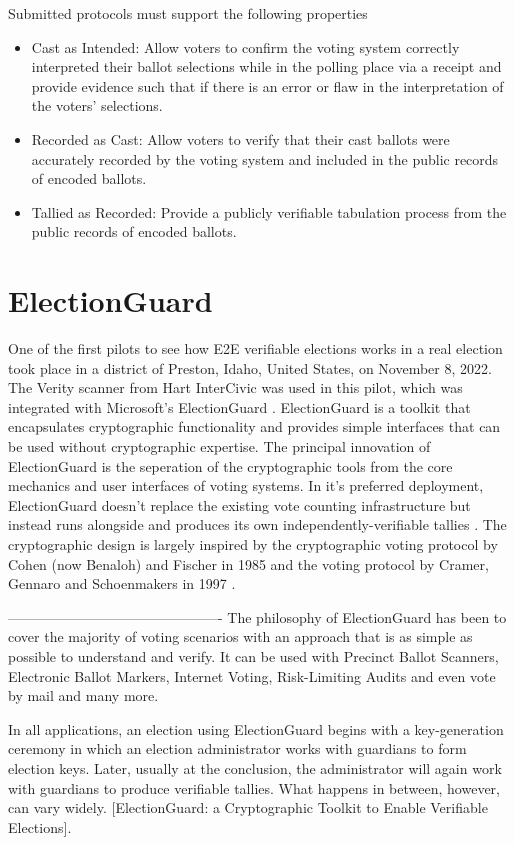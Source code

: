 Submitted protocols must support the following properties
\begin{itemize}
      \item Cast as Intended: Allow voters to confirm the voting system correctly interpreted their ballot selections while in the polling place via a receipt and provide evidence such that if there is an error or flaw in the interpretation of the voters’ selections.
      \item Recorded as Cast: Allow voters to verify that their cast ballots were accurately recorded by the voting system and included in the public records of encoded ballots.
      \item Tallied as Recorded: Provide a publicly verifiable tabulation process from the public records of encoded ballots.
\end{itemize}

\section{ElectionGuard}

One of the first pilots to see how E2E verifiable elections works in a real election took place in a district of Preston, Idaho, United States, on November 8, 2022. The Verity scanner from Hart InterCivic was used in this pilot, which was integrated with Microsoft's ElectionGuard \cite{EAC}. ElectionGuard is a toolkit that encapsulates cryptographic functionality and provides simple interfaces that can be used without cryptographic expertise. The principal innovation of ElectionGuard is the seperation of the cryptographic tools from the core mechanics and user interfaces of voting systems. In it's preferred deployment, ElectionGuard doesn't replace the existing vote counting infrastructure but instead runs alongside and produces its own independently-verifiable tallies \cite[1-2]{eg-paper}. The cryptographic design is largely inspired by the cryptographic voting protocol by Cohen (now Benaloh) and Fischer in 1985 and the voting protocol by Cramer, Gennaro and Schoenmakers in 1997 \cite[5]{eg-paper}. 

----------------------------------------------
The philosophy of ElectionGuard has been to cover the majority of voting scenarios with an approach that is as simple as possible to understand and verify. It can be used with Precinct Ballot Scanners, Electronic Ballot Markers, Internet Voting, Risk-Limiting Audits and even vote by mail and many more.

In all applications, an election using ElectionGuard begins with a key-generation ceremony in
which an election administrator works with guardians to form election keys. Later, usually at the
conclusion, the administrator will again work with guardians to produce verifiable tallies. What
happens in between, however, can vary widely. [ElectionGuard: a Cryptographic Toolkit
to Enable Verifiable Elections].

